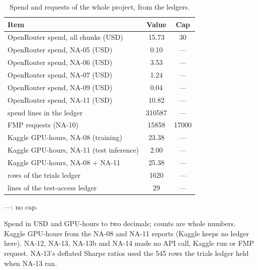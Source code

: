 \begin{table}[htbp]
\centering
\small
\begin{threeparttable}
\caption{Spend and requests of the whole project, from the ledgers.}\label{tab:a-spend}
\begin{tabular}{@{}lS[table-format=6.2]S[table-format=5.0]@{}}
\toprule
Item & {Value} & {Cap} \\
\midrule
OpenRouter spend, all chunks (USD) & 15.73 & 30 \\
OpenRouter spend, NA-05 (USD) & 0.10 & {---} \\
OpenRouter spend, NA-06 (USD) & 3.53 & {---} \\
OpenRouter spend, NA-07 (USD) & 1.24 & {---} \\
OpenRouter spend, NA-09 (USD) & 0.04 & {---} \\
OpenRouter spend, NA-11 (USD) & 10.82 & {---} \\
spend lines in the ledger & 310587 & {---} \\
FMP requests (NA-10) & 15858 & 17000 \\
Kaggle GPU-hours, NA-08 (training) & 23.38 & {---} \\
Kaggle GPU-hours, NA-11 (test inference) & 2.00 & {---} \\
Kaggle GPU-hours, NA-08 + NA-11 & 25.38 & {---} \\
rows of the trials ledger & 1620 & {---} \\
lines of the test-access ledger & 29 & {---} \\
\bottomrule
\end{tabular}
\begin{tablenotes}[flushleft]\footnotesize
\item ---: no cap.
\item Spend in USD and GPU-hours to two decimals; counts are whole numbers. Kaggle GPU-hours from the NA-08 and NA-11 reports (Kaggle keeps no ledger here). NA-12, NA-13, NA-13b and NA-14 made no API call, Kaggle run or FMP request. NA-13's deflated Sharpe ratios used the 545 rows the trials ledger held when NA-13 ran.
\end{tablenotes}
\end{threeparttable}
\end{table}
